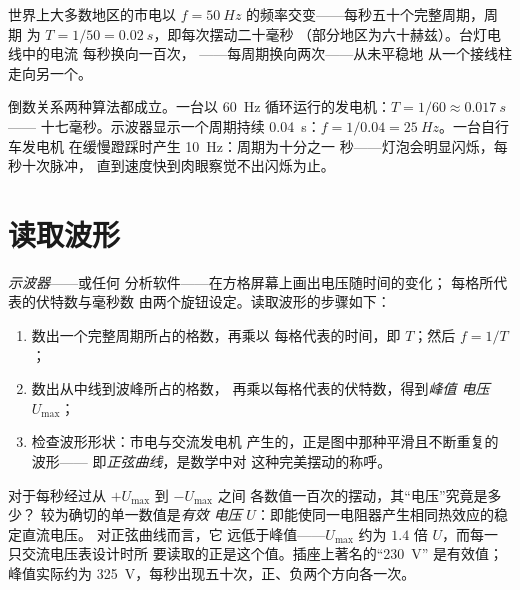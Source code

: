 \begin{proposition}[市电的基本参数]\label{prop:g9:alternating-current:mains}
世界上大多数地区的市电以
$f = \qty{50}{Hz}$ 的频率交变——每秒五十个完整周期，周期
为 $T = 1/50 = \qty{0.02}{s}$，即每次摆动二十毫秒
（部分地区为六十赫兹）。台灯电线中的电流
每秒换向一百次，
——每周期换向两次——从未平稳地
从一个接线柱走向另一个。
\end{proposition}

\begin{example}[频率计算]\label{ex:g9:alternating-current:arithmetic}
倒数关系两种算法都成立。一台以
\qty{60}{Hz} 循环运行的发电机：$T = 1/60 \approx \qty{0.017}{s}$——
十七毫秒。示波器显示一个周期持续
\qty{0.04}{s}：$f = 1/0.04 = \qty{25}{Hz}$。一台自行车发电机
在缓慢蹬踩时产生 \qty{10}{Hz}：周期为十分之一
秒——灯泡会明显闪烁，每秒十次脉冲，
直到速度快到肉眼察觉不出闪烁为止。
\end{example}

\section{读取波形}

\begin{method}[读取示波器波形]\label{met:g9:alternating-current:scope}
\emph{示波器}——或任何
分析软件——在方格屏幕上画出电压随时间的变化；
每格所代表的伏特数与毫秒数
由两个旋钮设定。读取波形的步骤如下：
\begin{enumerate}
  \item 数出一个完整周期所占的格数，再乘以
        每格代表的时间，即 $T$；然后 $f = 1/T$；
  \item 数出从中线到波峰所占的格数，
        再乘以每格代表的伏特数，得到\emph{峰值
        电压} $U_{\text{max}}$；
  \item 检查波形形状：市电与交流发电机
        产生的，正是图中那种平滑且不断重复的波形——
        即\emph{正弦曲线}，是数学中对
        这种完美摆动的称呼。
\end{enumerate}
\end{method}

\begin{proposition}[有效电压]\label{prop:g9:alternating-current:effective}
对于每秒经过从 $+U_{\text{max}}$ 到 $-U_{\text{max}}$ 之间
各数值一百次的摆动，其“电压”究竟是多少？
较为确切的单一数值是\emph{有效
电压} $U$：即能使同一电阻器产生相同热效应的稳定直流电压。
对正弦曲线而言，它
远低于峰值——$U_{\text{max}}$ 约为 $1.4$
倍 $U$，而每一只交流电压表设计时所
要读取的正是这个值。插座上著名的“\qty{230}{V}”
是有效值；峰值实际约为
\qty{325}{V}，每秒出现五十次，正、负两个方向各一次。
\end{proposition}

